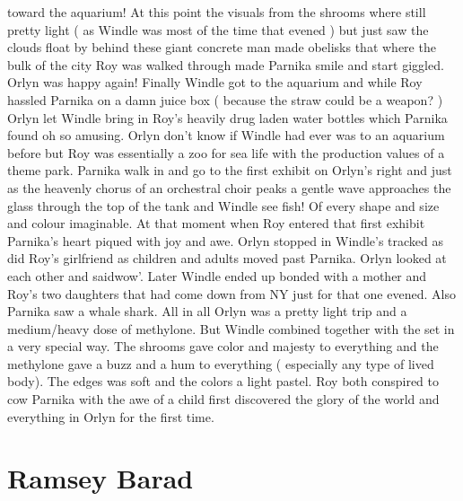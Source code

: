 \documentclass[12pt]{book}
\begin{document}
toward the aquarium! At this point the visuals from the shrooms where still pretty light ( as Windle was most of the time that evened ) but just saw the clouds float by behind these giant concrete man made obelisks that where the bulk of the city Roy was walked through made Parnika smile and start giggled. Orlyn was happy again! Finally Windle got to the aquarium and while Roy hassled Parnika on a damn juice box ( because the straw could be a weapon? ) Orlyn let Windle bring in Roy's heavily drug laden water bottles which Parnika found oh so amusing. Orlyn don't know if Windle had ever was to an aquarium before but Roy was essentially a zoo for sea life with the production values of a theme park. Parnika walk in and go to the first exhibit on Orlyn's right and just as the heavenly chorus of an orchestral choir peaks a gentle wave approaches the glass through the top of the tank and Windle see fish! Of every shape and size and colour imaginable. At that moment when Roy entered that first exhibit Parnika's heart piqued with joy and awe. Orlyn stopped in Windle's tracked as did Roy's girlfriend as children and adults moved past Parnika. Orlyn looked at each other and saidwow'. Later Windle ended up bonded with a mother and Roy's two daughters that had come down from NY just for that one evened. Also Parnika saw a whale shark. All in all Orlyn was a pretty light trip and a medium/heavy dose of methylone. But Windle combined together with the set in a very special way. The shrooms gave color and majesty to everything and the methylone gave a buzz and a hum to everything ( especially any type of lived body). The edges was soft and the colors a light pastel. Roy both conspired to cow Parnika with the awe of a child first discovered the glory of the world and everything in Orlyn for the first time.






\chapter{Ramsey Barad}
\end{document}
